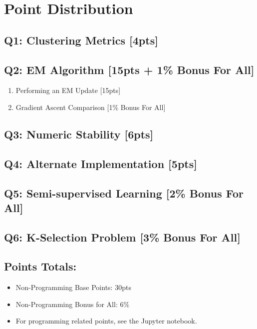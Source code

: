 \section*{Point Distribution}
\subsection*{Q1: Clustering Metrics [4pts]}

\subsection*{Q2: EM Algorithm [15pts + 1\% Bonus For All]}
\begin{enumerate}[label=\arabic*.]
    \itemsep0em
    \item Performing an EM Update [15pts]
    \item Gradient Ascent Comparison [1\% Bonus For All]
\end{enumerate}

\subsection*{Q3: Numeric Stability [6pts]}

\subsection*{Q4: Alternate Implementation [5pts]}

\subsection*{Q5: Semi-supervised Learning [2\% Bonus For All]}

\subsection*{Q6: K-Selection Problem [3\% Bonus For All]}


\bigskip
\subsection*{Points Totals:}
\begin{itemize}
    \item Non-Programming Base Points: 30pts
    \item Non-Programming Bonus for All: 6\%
    \item For programming related points, see the Jupyter notebook.
\end{itemize}
